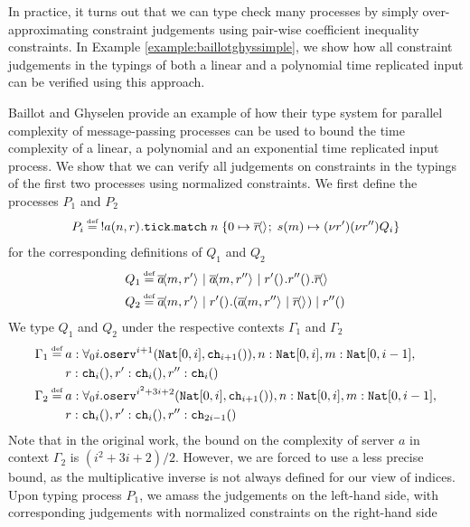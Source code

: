 In practice, it turns out that we can type check many processes by simply over-approximating constraint judgements using pair-wise coefficient inequality constraints. In Example \ref{example:baillotghyssimple}, we show how all constraint judgements in the typings of both a linear and a polynomial time replicated input can be verified using this approach. 
%
\begin{examp}\label{example:baillotghyssimple}
Baillot and Ghyselen \cite{BaillotGhyselen2021} provide an example of how their type system for parallel complexity of message-passing processes can be used to bound the time complexity of a linear, a polynomial and an exponential time replicated input process. We show that we can verify all judgements on constraints in the typings of the first two processes using normalized constraints. We first define the processes $P_1$ and $P_2$
\begin{align*}
    P_i \defeq\; !\inputch{a}{n,r}{}{\tick\match{n}{\asyncoutputch{r}{}{}}{m}{\newvar{r'}{\newvar{r''}{Q_i}}}}
\end{align*}
for the corresponding definitions of $Q_1$ and $Q_2$
\begin{align*}
    Q_1 \defeq&\; \asyncoutputch{a}{m,r'}{} \mid \asyncoutputch{a}{m,r''}{} \mid \inputch{r'}{}{}{\inputch{r''}{}{}{\asyncoutputch{r}{}{}}}\\
    Q_2 \defeq&\; \asyncoutputch{a}{m,r'}{} \mid \inputch{r'}{}{}{(\asyncoutputch{a}{m,r''}{} \mid \asyncoutputch{r}{}{})} \mid \asyncinputch{r''}{}{}
\end{align*}
We type $Q_1$ and $Q_2$ under the respective contexts $\Gamma_1$ and $\Gamma_2$
\begin{align*}
    \Gamma_1 \defeq&\; a : \forall_0 i.\texttt{oserv}^{i+1}(\texttt{Nat}[0,i],\texttt{ch}_{i+1}()), n : \texttt{Nat}[0,i], m : \texttt{Nat}[0,i-1],\\ &\; r : \texttt{ch}_{i}(),
     r' : \texttt{ch}_{i}(), r'' : \texttt{ch}_i()\\
    \Gamma_2 \defeq&\; a : \forall_0 i.\texttt{oserv}^{i^2+3i+2}(\texttt{Nat}[0,i],\texttt{ch}_{i+1}()), n : \texttt{Nat}[0,i], m : \texttt{Nat}[0,i-1],\\ &\; r : \texttt{ch}_{i}(),
     r' : \texttt{ch}_i(), r'' : \texttt{ch}_{2i-1}()
\end{align*}
Note that in the original work, the bound on the complexity of server $a$ in context $\Gamma_2$ is $(i^2+3i+2)/2$. However, we are forced to use a less precise bound, as the multiplicative inverse is not always defined for our view of indices. Upon typing process $P_1$, we amass the judgements on the left-hand side, with corresponding judgements with normalized constraints on the right-hand side

\end{examp}
